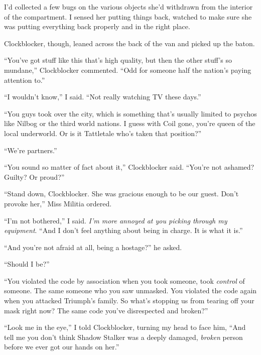 I'd collected a few bugs on the various objects she'd withdrawn from the interior of the compartment.  I sensed her putting things back, watched to make sure she was putting everything back properly and in the right place.



Clockblocker, though, leaned across the back of the van and picked up the baton.



``You've got stuff like this that's high quality, but then the other stuff's so mundane,'' Clockblocker commented.  ``Odd for someone half the nation's paying attention to.''



``I wouldn't know,'' I said.  ``Not really watching TV these days.''



``You guys took over the city, which is something that's usually limited to psychos like Nilbog or the third world nations.  I guess with Coil gone, you're queen of the local underworld.  Or is it Tattletale who's taken that position?''



``We're partners.''



``You sound so matter of fact about it,'' Clockblocker said.  ``You're not ashamed?  Guilty?  Or proud?''



``Stand down, Clockblocker.  She was gracious enough to be our guest.  Don't provoke her,'' Miss Militia ordered.



``I'm not bothered,'' I said.  \emph{I'm more annoyed at you picking through my equipment}.  ``And I don't feel anything about being in charge.  It is what it is.''



``And you're not afraid at all, being a hostage?'' he asked.



``Should I be?''



``You violated the code by association when you took someone, took \emph{control} of someone.  The same someone who you saw unmasked.  You violated the code again when you attacked Triumph's family.  So what's stopping us from tearing off your mask right now?  The same code you've disrespected and broken?''



``Look me in the eye,'' I told Clockblocker, turning my head to face him, ``And tell me you don't think Shadow Stalker was a deeply damaged, \emph{broken} person before we ever got our hands on her.''



